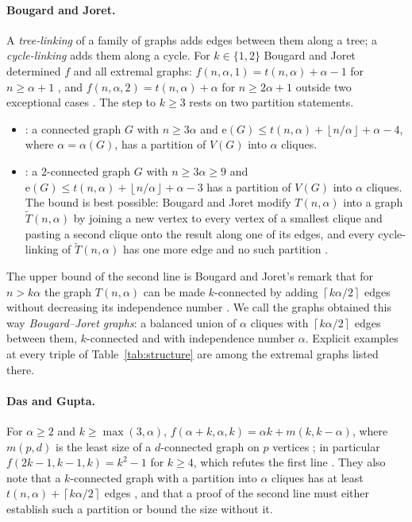 \documentclass[11pt]{article}
\theoremstyle{definition}
\theoremstyle{remark}
\newcommand{\e}{\mathrm{e}}
\newcommand{\ceil}[1]{\left\lceil #1\right\rceil}
\newcommand{\floor}[1]{\left\lfloor #1\right\rfloor}
\begin{document}
\paragraph{Bougard and Joret.} A \emph{tree-linking} of a family of graphs adds edges between them along a tree;
a \emph{cycle-linking} adds them along a cycle. For $k\in\{1,2\}$ Bougard and Joret determined $f$ and all extremal
graphs: $f(n,\alpha,1)=t(n,\alpha)+\alpha-1$ for $n\ge\alpha+1$ \cite[Proposition~5]{BJ}, and
$f(n,\alpha,2)=t(n,\alpha)+\alpha$ for $n\ge2\alpha+1$ outside two exceptional cases \cite[Proposition~6]{BJ}.
The step to $k\ge3$ rests on two partition statements.
\begin{itemize}
\item \cite[Proposition~7]{BJ}: a connected graph $G$ with $n\ge3\alpha$ and
$\e(G)\le t(n,\alpha)+\floor{n/\alpha}+\alpha-4$, where $\alpha=\alpha(G)$, has a partition of $V(G)$ into $\alpha$
cliques.
\item \cite[Proposition~8]{BJ}: a $2$-connected graph $G$ with $n\ge3\alpha\ge9$ and
$\e(G)\le t(n,\alpha)+\floor{n/\alpha}+\alpha-3$ has a partition of $V(G)$ into $\alpha$ cliques. The bound is best
possible: Bougard and Joret modify $T(n,\alpha)$ into a graph $\widetilde T(n,\alpha)$ by joining a new vertex to
every vertex of a smallest clique and pasting a second clique onto the result along one of its edges, and every
cycle-linking of $\widetilde T(n,\alpha)$ has one more edge and no such partition \cite[pp.~10--11]{BJ}.
\end{itemize}
The upper bound of the second line is Bougard and Joret's remark that for $n>k\alpha$ the graph $T(n,\alpha)$ can be
made $k$-connected by adding $\ceil{k\alpha/2}$ edges without decreasing its independence number
\cite[Section~6]{BJ}. We call the graphs obtained this way \emph{Bougard--Joret graphs}: a balanced union of
$\alpha$ cliques with $\ceil{k\alpha/2}$ edges between them, $k$-connected and with independence number $\alpha$.
Explicit examples at every triple of Table~\ref{tab:structure} are among the extremal graphs listed there.

\paragraph{Das and Gupta.} For $\alpha\ge2$ and $k\ge\max(3,\alpha)$, $f(\alpha+k,\alpha,k)=\alpha k+m(k,k-\alpha)$,
where $m(p,d)$ is the least size of a $d$-connected graph on $p$ vertices \cite[Theorem~3.1]{DG}; in particular
$f(2k-1,k-1,k)=k^2-1$ for $k\ge4$, which refutes the first line \cite[Corollary~3.3]{DG}. They also note that a
$k$-connected graph with a partition into $\alpha$ cliques has at least $t(n,\alpha)+\ceil{k\alpha/2}$ edges
\cite[Proposition~4.2]{DG}, and that a proof of the second line must either establish such a partition or bound the
size without it.
\end{document}
